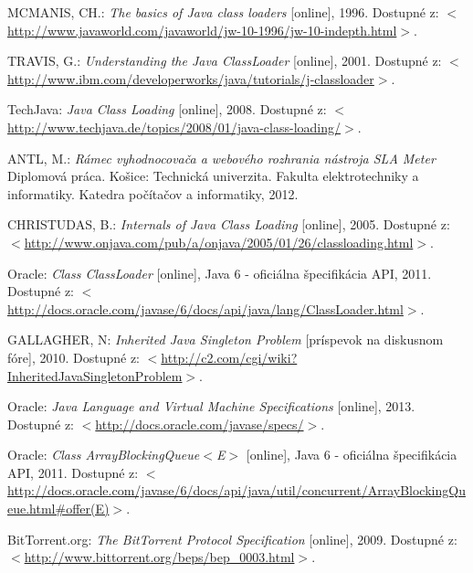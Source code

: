 \begin{thebibliography}{999}
MCMANIS, CH.: \emph{The basics of Java class loaders} [online], 1996. Dostupné 
z: $<$\url{http://www.javaworld.com/javaworld/jw-10-1996/jw-10-indepth.html}$>$.

TRAVIS, G.: \emph{Understanding the Java ClassLoader} [online], 2001. Dostupné 
z: $<$\url{http://www.ibm.com/developerworks/java/tutorials/j-classloader}$>$.

TechJava: \emph{Java Class Loading} [online], 2008. Dostupné 
z: $<$\url{http://www.techjava.de/topics/2008/01/java-class-loading/}$>$.

ANTL, M.: \emph{Rámec vyhodnocovača a webového rozhrania nástroja SLA Meter} 
Diplomová práca. Košice: Technická univerzita. Fakulta elektrotechniky a informatiky. 
Katedra počítačov a informatiky, 2012.

CHRISTUDAS, B.: \emph{Internals of Java Class Loading} [online], 2005. Dostupné 
z: $<$\url{http://www.onjava.com/pub/a/onjava/2005/01/26/classloading.html}$>$.

Oracle: \emph{Class ClassLoader} [online], Java 6 - oficiálna špecifikácia API, 2011. 
Dostupné z: $<$\url{http://docs.oracle.com/javase/6/docs/api/java/lang/ClassLoader.html}$>$.

GALLAGHER, N: \emph{Inherited Java Singleton Problem} [príspevok na diskusnom fóre], 2010. 
Dostupné z: $<$\url{http://c2.com/cgi/wiki?InheritedJavaSingletonProblem}$>$.

Oracle: \emph{Java Language and Virtual Machine Specifications} [online], 2013. 
Dostupné z: $<$\url{http://docs.oracle.com/javase/specs/}$>$.

Oracle: \emph{Class ArrayBlockingQueue$<$E$>$} [online], Java 6 - oficiálna špecifikácia API, 2011. 
Dostupné z: 
$<$\url{http://docs.oracle.com/javase/6/docs/api/java/util/concurrent/ArrayBlockingQueue.html#offer(E)}$>$.

BitTorrent.org: \emph{The BitTorrent Protocol Specification} [online], 2009. 
Dostupné z: $<$\url{http://www.bittorrent.org/beps/bep_0003.html}$>$.

\end{thebibliography}